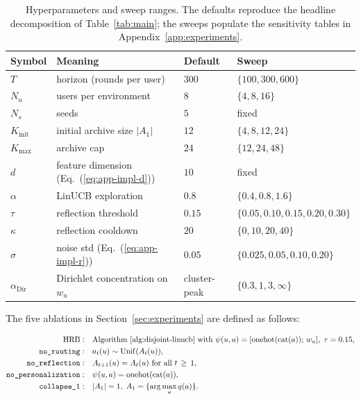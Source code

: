 \documentclass{article} %
\renewcommand{\eqref}[1]{\textup{(\ref{#1})}}
\begin{document}
\begin{table}[h]
\centering
\small
\begin{tabular}{llll}
\toprule
Symbol & Meaning & Default & Sweep \\
\midrule
$T$ & horizon (rounds per user) & $300$ & $\{100, 300, 600\}$ \\
$N_u$ & users per environment & $8$ & $\{4, 8, 16\}$ \\
$N_s$ & seeds & $5$ & fixed \\
$K_{\text{init}}$ & initial archive size $|A_1|$ & $12$ & $\{4, 8, 12, 24\}$ \\
$K_{\max}$ & archive cap & $24$ & $\{12, 24, 48\}$ \\
$d$ & feature dimension (Eq.~\eqref{eq:app-impl-d}) & $10$ & fixed \\
$\alpha$ & LinUCB exploration & $0.8$ & $\{0.4, 0.8, 1.6\}$ \\
$\tau$ & reflection threshold & $0.15$ & $\{0.05, 0.10, 0.15, 0.20, 0.30\}$ \\
$\kappa$ & reflection cooldown & $20$ & $\{0, 10, 20, 40\}$ \\
$\sigma$ & noise std (Eq.~\eqref{eq:app-impl-r}) & $0.05$ & $\{0.025, 0.05, 0.10, 0.20\}$ \\
$\alpha_{\mathrm{Dir}}$ & Dirichlet concentration on $w_u$ & cluster-peak & $\{0.3, 1, 3, \infty\}$ \\
\bottomrule
\end{tabular}
\caption{Hyperparameters and sweep ranges. The defaults reproduce the headline decomposition of Table~\ref{tab:main}; the sweeps populate the sensitivity tables in Appendix~\ref{app:experiments}.}
\label{tab:app-impl-hparams}
\end{table}

The five ablations in Section~\ref{sec:experiments} are defined as follows:

\begin{align}
\label{eq:app-impl-abl-full}
\textnormal{HRB} :&\quad \text{Algorithm~\ref{alg:disjoint-linucb} with } \psi(u,a) = [\mathrm{onehot}(\mathrm{cat}(a));\, w_u],\; \tau=0.15,\\
\label{eq:app-impl-abl-noroute}
\texttt{no\_routing} :&\quad a_t(u) \sim \mathrm{Unif}(A_t(u)),\\
\label{eq:app-impl-abl-noref}
\texttt{no\_reflection} :&\quad A_{t+1}(u) = A_t(u) \text{ for all } t \,\ge\, 1,\\
\label{eq:app-impl-abl-nopers}
\texttt{no\_personalization} :&\quad \psi(u,a) = \mathrm{onehot}(\mathrm{cat}(a)),\\
\label{eq:app-impl-abl-coll1}
\texttt{collapse\_1} :&\quad |A_1| = 1,\; A_1 = \{\arg\max_{a} q(a)\}.
\end{align}
\end{document}
